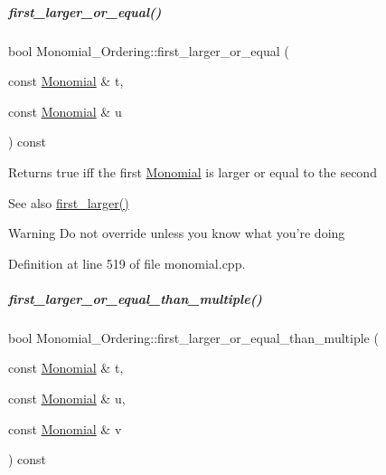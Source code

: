 \mbox{\label{group__orderinggroup_afbae8e00a02ce0334bb0376cf0f0db75}} 
\subparagraph{\texorpdfstring{first\+\_\+larger\+\_\+or\+\_\+equal()}{first\_larger\_or\_equal()}}
{\footnotesize\ttfamily bool Monomial\+\_\+\+Ordering\+::first\+\_\+larger\+\_\+or\+\_\+equal (\begin{DoxyParamCaption}\item[{const \hyperlink{group__polygroup_class_monomial}{Monomial} \&}]{t,  }\item[{const \hyperlink{group__polygroup_class_monomial}{Monomial} \&}]{u }\end{DoxyParamCaption}) const}

\begin{DoxyReturn}{Returns}
{\ttfamily true} iff the first \hyperlink{group__polygroup_class_monomial}{Monomial} is larger or equal to the second 
\end{DoxyReturn}
\begin{DoxySeeAlso}{See also}
\hyperlink{group__orderinggroup_aed41fe82e1ca5cd287a93d287fee7c20}{first\+\_\+larger()} 
\end{DoxySeeAlso}
\begin{DoxyWarning}{Warning}
Do not override unless you know what you're doing 
\end{DoxyWarning}


Definition at line 519 of file monomial.\+cpp.

\mbox{\label{group__orderinggroup_ad4af4c79cf46666222fe30fdd4ceb45e}} 
\subparagraph{\texorpdfstring{first\+\_\+larger\+\_\+or\+\_\+equal\+\_\+than\+\_\+multiple()}{first\_larger\_or\_equal\_than\_multiple()}}
{\footnotesize\ttfamily bool Monomial\+\_\+\+Ordering\+::first\+\_\+larger\+\_\+or\+\_\+equal\+\_\+than\+\_\+multiple (\begin{DoxyParamCaption}\item[{const \hyperlink{group__polygroup_class_monomial}{Monomial} \&}]{t,  }\item[{const \hyperlink{group__polygroup_class_monomial}{Monomial} \&}]{u,  }\item[{const \hyperlink{group__polygroup_class_monomial}{Monomial} \&}]{v }\end{DoxyParamCaption}) const}

